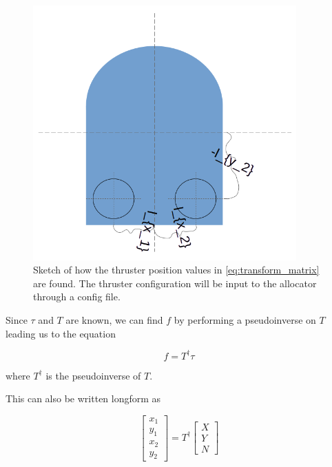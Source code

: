 \documentclass[class=article, crop=false, draft=true]{standalone}
\begin{document}
\begin{figure}
    \centering
    \includegraphics[width=0.9\textwidth]{thruster_position_sketch}
    \caption{Sketch of how the thruster position values in \cref{eq:transform_matrix} are found. The thruster configuration will be input to the allocator through a config file.}
    \label{fig:thruster_position_sketch}
\end{figure}

Since \(\tau\) and \(T\) are known, we can find \(f\) by performing a pseudoinverse on \(T\) leading us to the equation

\begin{equation}\label{eq:final_allocator}
f = T^\dagger \tau
\end{equation}

where \(T^\dagger\) is the pseudoinverse of \(T\).

This can also be written longform as

\begin{equation}\label{eq:long_allocator}
\begin{bmatrix}x_1 \\ y_1 \\ x_2 \\ y_2 \end{bmatrix} = T^\dagger \begin{bmatrix}X \\ Y \\ N\end{bmatrix}
\end{equation}
\end{document}
